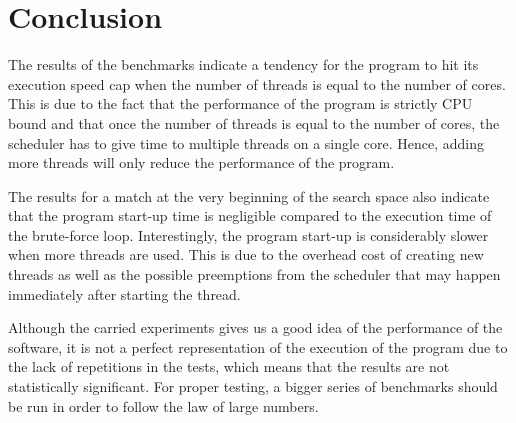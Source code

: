 \documentclass{article}
\begin{document}
\section{Conclusion}

The results of the benchmarks indicate a tendency for the program to hit its execution speed cap when the number of threads
is equal to the number of cores.
This is due to the fact that the performance of the program is strictly CPU bound and that once the number of
threads is equal to the number of cores, the scheduler has to give time to multiple threads on a single core. 
Hence, adding more threads will only reduce the performance of the program.

The results for a match at the very beginning of the search space also indicate that the program start-up time is
negligible compared to the execution time of the brute-force loop. Interestingly, the program start-up is considerably
slower when more threads are used. This is due to the overhead cost of creating new threads as well as the possible
preemptions from the scheduler that may happen immediately after starting the thread.

Although the carried experiments gives us a good idea of the performance of the software, it is not a perfect representation of
the execution of the program due to the lack of repetitions in the tests, which means that the results
are not statistically significant. For proper testing, a bigger series of benchmarks should be run in order to follow
the law of large numbers.
\end{document}
